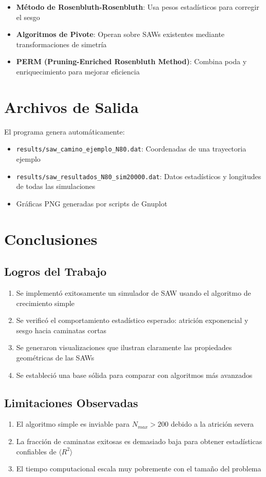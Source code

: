 \documentclass[11pt,a4paper]{article}
\begin{document}
\begin{itemize}
    \item \textbf{Método de Rosenbluth-Rosenbluth}: Usa pesos estadísticos para corregir el sesgo
    \item \textbf{Algoritmos de Pivote}: Operan sobre SAWs existentes mediante transformaciones de simetría
    \item \textbf{PERM (Pruning-Enriched Rosenbluth Method)}: Combina poda y enriquecimiento para mejorar eficiencia
\end{itemize}

\section{Archivos de Salida}

El programa genera automáticamente:
\begin{itemize}
    \item \texttt{results/saw\_camino\_ejemplo\_N80.dat}: Coordenadas de una trayectoria ejemplo
    \item \texttt{results/saw\_resultados\_N80\_sim20000.dat}: Datos estadísticos y longitudes de todas las simulaciones
    \item Gráficas PNG generadas por scripts de Gnuplot
\end{itemize}

\section{Conclusiones}

\subsection{Logros del Trabajo}
\begin{enumerate}
    \item Se implementó exitosamente un simulador de SAW usando el algoritmo de crecimiento simple
    \item Se verificó el comportamiento estadístico esperado: atrición exponencial y sesgo hacia caminatas cortas
    \item Se generaron visualizaciones que ilustran claramente las propiedades geométricas de las SAWs
    \item Se estableció una base sólida para comparar con algoritmos más avanzados
\end{enumerate}

\subsection{Limitaciones Observadas}
\begin{enumerate}
    \item El algoritmo simple es inviable para $N_{max} > 200$ debido a la atrición severa
    \item La fracción de caminatas exitosas es demasiado baja para obtener estadísticas confiables de $\langle R^2 \rangle$
    \item El tiempo computacional escala muy pobremente con el tamaño del problema
\end{enumerate}
\end{document}
